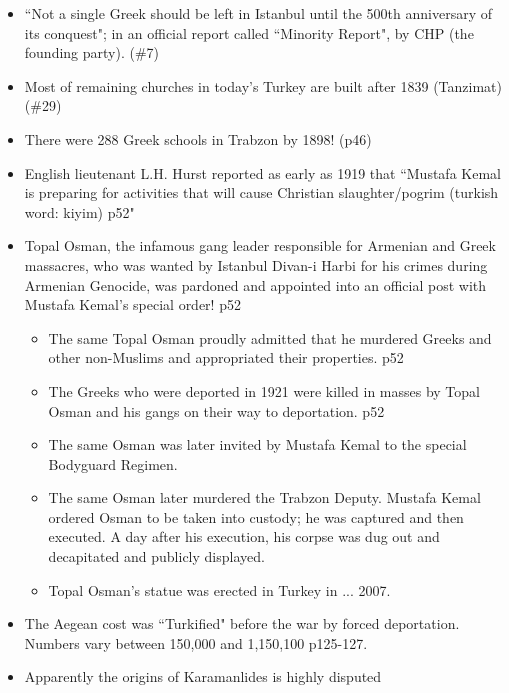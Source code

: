 \documentclass[a4paper]{book}
\begin{document}
\begin{itemize}
\item ``Not a single Greek should be left in Istanbul until the 500th anniversary of its conquest"; in an official report called ``Minority Report", by CHP (\ie the founding party). (\#7)
\item Most of remaining churches in today's Turkey are built after 1839 (Tanzimat) (\#29)
\item There were 288 Greek schools in Trabzon by 1898! (p46)
\item English lieutenant L.H. Hurst reported as early as 1919 that ``Mustafa Kemal is preparing for activities that will cause Christian slaughter/pogrim (turkish word: kiyim) p52"
\item Topal Osman, the infamous gang leader responsible for Armenian and Greek massacres, who was wanted by Istanbul Divan-i Harbi for his crimes during Armenian Genocide, was pardoned and appointed into an official post with Mustafa Kemal's special order! p52
	\begin{itemize}
	\item The same Topal Osman proudly admitted that he murdered Greeks and other non-Muslims and appropriated their properties. p52 
	\item The Greeks who were deported in 1921 were killed in masses by Topal Osman and his gangs on their way to deportation. p52
	\item The same Osman was later invited by Mustafa Kemal to the special Bodyguard Regimen.
	\item The same Osman later murdered the Trabzon Deputy. Mustafa Kemal ordered Osman to be taken into custody; he was captured and then executed. A day after his execution, his corpse was dug out and decapitated and publicly displayed.
	\item Topal Osman's statue was erected in Turkey in ... 2007.
	\end{itemize}
\item The Aegean cost was ``Turkified" before the war by forced deportation. Numbers vary between 150,000 and 1,150,100 p125-127.
\end{itemize}

\begin{itemize}
\item Apparently the origins of Karamanlides is highly disputed 
\end{itemize}
\end{document}
